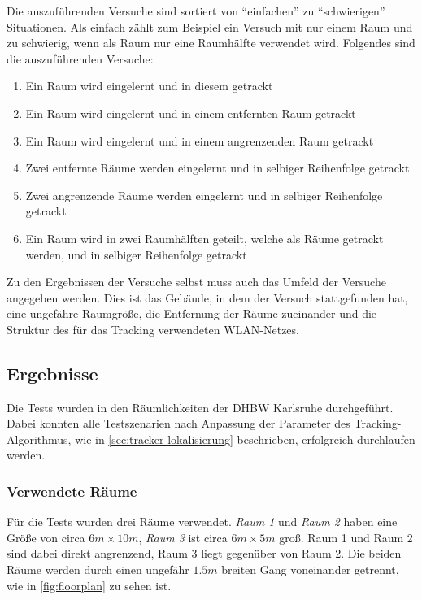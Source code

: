 Die auszuführenden Versuche sind sortiert von \enquote{einfachen} zu \enquote{schwierigen} Situationen.
Als einfach zählt zum Beispiel ein Versuch mit nur einem Raum und zu schwierig, wenn als Raum nur eine
Raumhälfte verwendet wird.
Folgendes sind die auszuführenden Versuche:
\begin{enumerate}[label=\textbf{TS-\arabic*}]
	\item \label{ts:gleicher-raum} Ein Raum wird eingelernt und in diesem getrackt
	\item \label{ts:entfernter-raum} Ein Raum wird eingelernt und in einem entfernten Raum getrackt
	\item \label{ts:angrenzender-raum} Ein Raum wird eingelernt und in einem angrenzenden Raum getrackt
	\item \label{ts:zwei-nacheinander} Zwei entfernte Räume werden eingelernt und in selbiger Reihenfolge getrackt
	\item \label{ts:zwei-angrenzende-nacheinander} Zwei angrenzende Räume werden eingelernt und in selbiger Reihenfolge getrackt
	\item \label{ts:raumhälften} Ein Raum wird in zwei Raumhälften geteilt, welche als Räume getrackt
		werden, und in selbiger Reihenfolge getrackt
\end{enumerate}

Zu den Ergebnissen der Versuche selbst muss auch das Umfeld der Versuche angegeben werden.
Dies ist das Gebäude, in dem der Versuch stattgefunden hat, eine ungefähre Raumgröße, die Entfernung der Räume zueinander
und die Struktur des für das Tracking verwendeten \gls{WLAN}-Netzes.

\subsection{Ergebnisse}

Die Tests wurden in den Räumlichkeiten der \gls{DHBW} Karlsruhe durchgeführt.
Dabei konnten alle Testszenarien nach Anpassung der Parameter des Tracking-Algorithmus, wie
in \autoref{sec:tracker-lokalisierung} beschrieben, erfolgreich durchlaufen werden.

\subsubsection{Verwendete Räume}

Für die Tests wurden drei Räume verwendet. \emph{Raum 1} und \emph{Raum 2} haben eine Größe von
circa $6m\times10m$, \emph{Raum 3} ist circa $6m\times5m$ groß. Raum 1 und Raum 2 sind dabei direkt
angrenzend, Raum 3 liegt gegenüber von Raum 2. Die beiden Räume werden durch einen ungefähr $1.5m$
breiten Gang voneinander getrennt, wie in \autoref{fig:floorplan} zu sehen ist.

